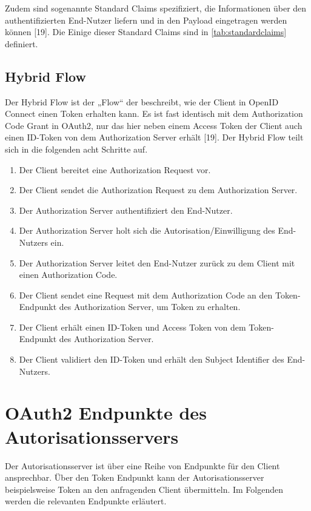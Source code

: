 Zudem sind sogenannte Standard Claims spezifiziert, die Informationen über den 
authentifizierten End-Nutzer liefern und in den Payload eingetragen werden können [19]. Die  
Einige dieser Standard Claims sind in \autoref{tab:standardclaims} definiert. 

\subsection{Hybrid Flow}
\label{subsec:OpenIDConnect:HybridFlow}
Der Hybrid Flow ist der „Flow“ der beschreibt, wie der Client in OpenID Connect einen
Token erhalten kann. Es ist fast identisch mit dem Authorization Code Grant in OAuth2, nur 
das hier neben einem Access Token der Client auch einen ID-Token von dem Authorization 
Server erhält [19]. Der Hybrid Flow teilt sich in die folgenden acht Schritte auf.
\begin{enumerate}
  \item Der Client bereitet eine Authorization Request vor.
  \item Der Client sendet die Authorization Request zu dem Authorization Server.
  \item Der Authorization Server authentifiziert den End-Nutzer. 
  \item Der Authorization Server holt sich die Autorisation/Einwilligung des End-Nutzers ein. 
  \item Der Authorization Server leitet den End-Nutzer zurück zu dem Client mit 
  einen Authorization Code.
  \item Der Client sendet eine Request mit dem Authorization Code an den Token-Endpunkt des Authorization Server, um Token zu erhalten. 
  \item Der Client erhält einen ID-Token und Access Token von dem Token-Endpunkt des Authorization Server.
  \item Der Client validiert den ID-Token und erhält den Subject Identifier des End-Nutzers.    
\end{enumerate}

\section{OAuth2 Endpunkte des Autorisationsservers}
\label{sec:OAuth2EndpunktedesAutorisationsservers}

Der Autorisationsserver ist über eine Reihe von Endpunkte für den Client ansprechbar. Über den Token 
Endpunkt kann der Autorisationsserver beispielsweise Token an den anfragenden Client 
übermitteln. Im Folgenden werden die relevanten Endpunkte erläutert.

